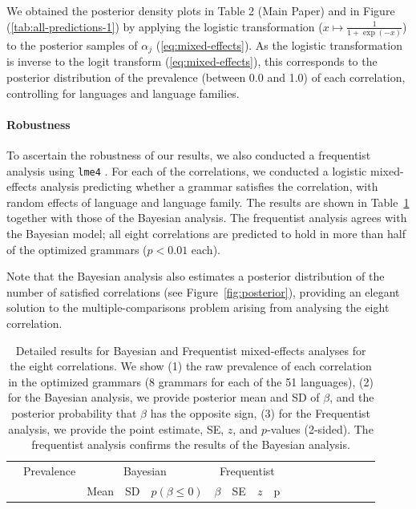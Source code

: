 \documentclass[10pt,twoside,lineno]{article}
\begin{document}
We obtained the posterior density plots in Table 2 (Main Paper) and in Figure (\ref{tab:all-predictions-1}) by applying the logistic transformation ($x \mapsto \frac{1}{1+\exp(-x)}$) to the posterior samples of $\alpha_j$ (\ref{eq:mixed-effects}).
As the logistic transformation is inverse to the logit transform (\ref{eq:mixed-effects}), this corresponds to the posterior distribution of the prevalence (between 0.0 and 1.0) of each correlation, controlling for languages and language families.






\paragraph{Robustness}
To ascertain the robustness of our results, we also conducted a frequentist analysis using \texttt{lme4} \cite{bates2015fitting}.
For each of the correlations, we conducted a logistic mixed-effects analysis predicting whether a grammar satisfies the correlation, with random effects of language and language family.
The results are shown in Table~\ref{tab:corr-regression} together with those of the Bayesian analysis.
The frequentist analysis agrees with the Bayesian model; all eight correlations are predicted to hold in more than half of the optimized grammars ($p < 0.01$ each).

Note that the Bayesian analysis  also estimates a posterior distribution of the number of satisfied correlations (see Figure~\ref{fig:posterior}), providing an elegant solution to the multiple-comparisons problem arising from analysing the eight correlation.



\begin{table}
\small{
\begin{center}
\begin{tabular}{|l||l|lll|llll|ll|llllll}
\hline
 & Prevalence & \multicolumn{3}{c|}{Bayesian} & \multicolumn{4}{c|}{Frequentist} \\ 
& & Mean & SD & $p(\beta \leq 0)$ & $\beta$ & SE & $z$ & p \\
\hline\hline
	
\hline
\end{tabular}
\end{center}
}
	\caption{Detailed results for Bayesian and Frequentist mixed-effects analyses for the eight correlations. 
We show (1) the raw prevalence of each correlation in the optimized grammars (8 grammars for each of the 51 languages),
(2) for the Bayesian analysis, we provide posterior mean and SD of $\beta$, and the posterior probability that $\beta$ has the opposite sign,
(3) for the Frequentist analysis, we provide the point estimate, SE, $z$, and $p$-values (2-sided).
The frequentist analysis confirms the results of the Bayesian analysis.
}\label{tab:corr-regression}
\end{table}
\end{document}
